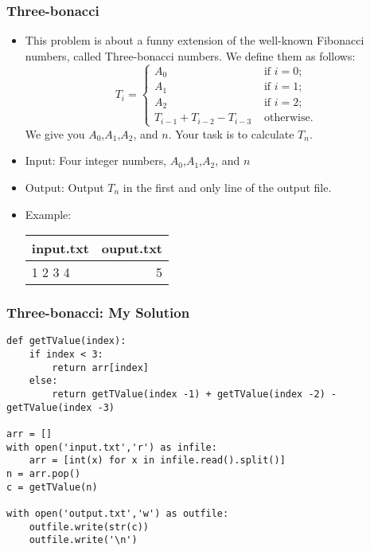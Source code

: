 \begin{frame}[fragile]\frametitle{Three-bonacci}
\begin{itemize}
\item This problem is about a funny extension of the well-known Fibonacci numbers, called Three-bonacci numbers. We define them as follows:
\begin{equation}
T_i = \begin{cases}
      	A_0 & \text{ if } i = 0; \\
        A_1 & \text{ if } i = 1; \\
        A_2 & \text{ if } i = 2; \\
        T_{i - 1} + T_{i - 2} - T_{i - 3} & \text{ otherwise.}
      \end{cases}
\end{equation}
We give you $A_0$,$A_1$,$A_2$, and $n$. Your task is to calculate $T_n$.
\item Input: Four integer numbers, $A_0$,$A_1$,$A_2$, and $n$
\item Output: Output $T_n$  in the first and only line of the output file.
\item Example:

\begin{table}[h!]
    \begin{tabular}{|l|r|}
	\hline
      input.txt & ouput.txt\\
      \hline
      1 2 3 4 & 5\\
	  \hline
    \end{tabular}
\end{table}
\end{itemize}
\end{frame}

\begin{frame}[fragile]\frametitle{Three-bonacci: My Solution}
\begin{lstlisting}
def getTValue(index):
	if index < 3:
		return arr[index]
	else:
		return getTValue(index -1) + getTValue(index -2) - getTValue(index -3)
		
arr = []
with open('input.txt','r') as infile:
	arr = [int(x) for x in infile.read().split()]
n = arr.pop()
c = getTValue(n)

with open('output.txt','w') as outfile:
	outfile.write(str(c))
	outfile.write('\n')
\end{lstlisting}
\end{frame}

